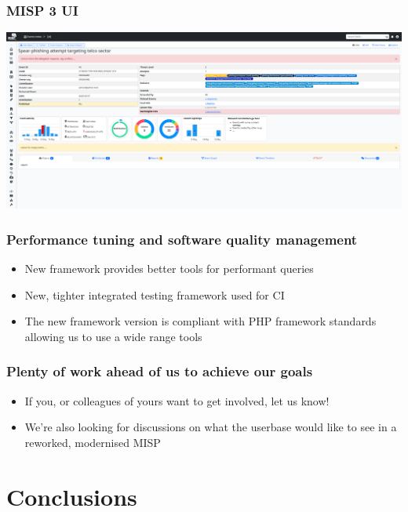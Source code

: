 \begin{frame}
\frametitle{MISP 3 UI}
\begin{center}
\includegraphics[scale=0.18]{images/misp3.png}
\end{center}
\end{frame}

\begin{frame}
  \frametitle{Performance tuning and software quality management}
  \begin{itemize}
     \item New framework provides better tools for performant queries
     \item New, tighter integrated testing framework used for CI
     \item The new framework version is compliant with PHP framework standards allowing us to use a wide range tools
  \end{itemize}
\end{frame}

\begin{frame}
  \frametitle{Plenty of work ahead of us to achieve our goals}
  \begin{itemize}
     \item If you, or colleagues of yours want to get involved, let us know!
     \item We're also looking for discussions on what the userbase would like to see in a reworked, modernised MISP
  \end{itemize}
\end{frame}

\section{Conclusions}

